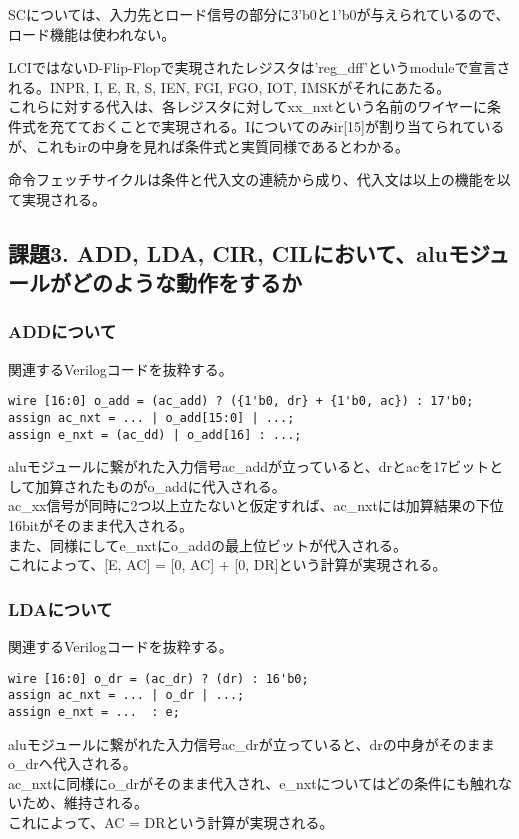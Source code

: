 \documentclass{jsarticle}
\begin{document}
SCについては、入力先とロード信号の部分に3'b0と1'b0が与えられているので、ロード機能は使われない。

LCIではないD-Flip-Flopで実現されたレジスタは'reg\_dff'というmoduleで宣言される。INPR, I, E, R, S, IEN, FGI, FGO, IOT, IMSKがそれにあたる。\\
これらに対する代入は、各レジスタに対してxx\_nxtという名前のワイヤーに条件式を充てておくことで実現される。Iについてのみir[15]が割り当てられているが、これもirの中身を見れば条件式と実質同様であるとわかる。

命令フェッチサイクルは条件と代入文の連続から成り、代入文は以上の機能を以て実現される。

\subsection*{課題3. ADD, LDA, CIR, CILにおいて、aluモジュールがどのような動作をするか}

\subsubsection*{ADDについて}
関連するVerilogコードを抜粋する。
\begin{lstlisting}
wire [16:0] o_add = (ac_add) ? ({1'b0, dr} + {1'b0, ac}) : 17'b0;
assign ac_nxt = ... | o_add[15:0] | ...;
assign e_nxt = (ac_dd) | o_add[16] : ...;
\end{lstlisting}

aluモジュールに繋がれた入力信号ac\_addが立っていると、drとacを17ビットとして加算されたものがo\_addに代入される。\\
ac\_xx信号が同時に2つ以上立たないと仮定すれば、ac\_nxtには加算結果の下位16bitがそのまま代入される。\\
また、同様にしてe\_nxtにo\_addの最上位ビットが代入される。\\
これによって、[E, AC] = [0, AC] + [0, DR]という計算が実現される。\\

\subsubsection*{LDAについて}
関連するVerilogコードを抜粋する。
\begin{lstlisting}
wire [16:0] o_dr = (ac_dr) ? (dr) : 16'b0;
assign ac_nxt = ... | o_dr | ...;
assign e_nxt = ...  : e;
\end{lstlisting}
aluモジュールに繋がれた入力信号ac\_drが立っていると、drの中身がそのままo\_drへ代入される。\\
ac\_nxtに同様にo\_drがそのまま代入され、e\_nxtについてはどの条件にも触れないため、維持される。\\
これによって、AC = DRという計算が実現される。
\end{document}
